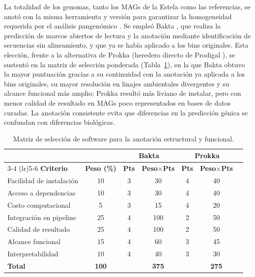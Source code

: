 La totalidad de los genomas, tanto los MAGs de la Estela como las referencias, se anotó con la misma herramienta y versión para garantizar la homogeneidad requerida por el análisis pangenómico \cite{panaroo2020}. Se empleó Bakta \cite{schwengers2021}, que realiza la predicción de marcos abiertos de lectura y la anotación mediante identificación de secuencias sin alineamiento, y que ya se había aplicado a los bins originales. Esta elección, frente a la alternativa de Prokka \cite{prokka2014} (heredero directo de Prodigal \cite{Hyatt2010}), se sustentó en la matriz de selección ponderada (Tabla~\ref{tab:seleccion_anotacion}), en la que Bakta obtuvo la mayor puntuación gracias a su continuidad con la anotación ya aplicada a los bins originales, su mayor resolución en linajes ambientales divergentes y su alcance funcional más amplio; Prokka resultó más liviano de instalar, pero con menor calidad de resultado en MAGs poco representados en bases de datos curadas. La anotación consistente evita que diferencias en la predicción génica se confundan con diferencias biológicas.

\begin{table}[H]
\centering
\footnotesize
\caption{Matriz de selección de software para la anotación estructural y funcional.}
\label{tab:seleccion_anotacion}
\begin{tabular}{@{}lcccccc@{}}
\toprule
& & \multicolumn{2}{c}{\textbf{Bakta}} & \multicolumn{2}{c}{\textbf{Prokka}} \\
\cmidrule(lr){3-4} \cmidrule(lr){5-6}
\textbf{Criterio} & \textbf{Peso (\%)} & \textbf{Pts} & \textbf{Peso$\times$Pts} & \textbf{Pts} & \textbf{Peso$\times$Pts} \\
\midrule
Facilidad de instalación & 10 & 3 & 30  & 4 & 40 \\
Acceso a dependencias    & 10 & 3 & 30  & 4 & 40 \\
Costo computacional      & 5  & 3 & 15  & 4 & 20 \\
Integración en pipeline  & 25 & 4 & 100 & 2 & 50 \\
Calidad de resultado     & 25 & 4 & 100 & 2 & 50 \\
Alcance funcional        & 15 & 4 & 60  & 3 & 45 \\
Interpretabilidad        & 10 & 4 & 40  & 3 & 30 \\
\midrule
\textbf{Total} & \textbf{100} & & \textbf{375} & & \textbf{275} \\
\bottomrule
\end{tabular}
\end{table}

